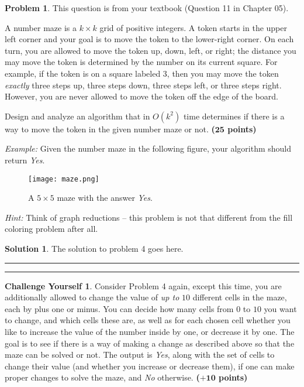 \documentclass{article}
\theoremstyle{definition}
\newtheorem{problem}{Problem}
\newtheorem*{challenge}{Challenge Yourself}
\def\fline{\rule{0.75\linewidth}{0.5pt}}
\newcommand{\finishline}{\begin{center}\fline\end{center}}
\newtheorem*{solution*}{Solution}
\newenvironment{solution}{\begin{solution*}}{{\finishline} \end{solution*}}
\newcommand{\grade}[1]{\hfill{\textbf{($\mathbf{#1}$ points)}}}
\begin{document}
\begin{problem}
	This question is from your textbook (Question 11 in Chapter 05). 
	
	A number maze is a $k \times k$ 
	grid of positive integers. 
	A token starts in the upper left corner and your goal is to move the token to the lower-right corner.
	On each turn, you are allowed to move the token up, down, left, or right; the distance you may move the token is determined by the number on its
current square. For example, if the token is on a square labeled $3$, then you may move the token \emph{exactly} three steps up, three steps down, three steps left, or
three steps right. However, you are never allowed to move the token off the edge of the board.

Design and analyze an algorithm that in $O(k^2)$ time determines if there is a way to move the token in the given number maze or not. \grade{25}


\medskip

\emph{Example:}  Given the number maze in the following figure, your algorithm should return \emph{Yes}. 

\begin{figure}[h!]
\centering
\texttt{[image: maze.png]}
\caption{A $5 \times 5$ maze with the answer \emph{Yes}. }
\end{figure} 

\medskip

\emph{Hint:} Think of graph reductions -- this problem is not that different from the fill coloring problem after all.

 
\end{problem}

\begin{solution}
 The solution to problem 4 goes here. 
\end{solution}



\smallskip

\finishline

\smallskip

\begin{challenge}
	Consider Problem 4 again, except this time, you are additionally allowed to change the value of \emph{up to} $10$ different cells in the maze, each by plus one or minus. You can decide how many cells from $0$ to $10$ you want to change, 
	and which cells these are, as well as for each chosen cell whether you like to increase the value of the number inside by one, or decrease it by one. The goal is to see if there is a way of making a change as described above so that the 
	maze can be solved or not. The output is \emph{Yes}, along with the set of cells to change their value (and whether you increase or decrease them), if one can make proper changes to solve the maze, and \emph{No} otherwise. 
	 \grade{+10}
\end{challenge}
\end{document}
